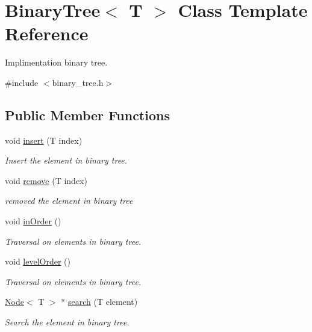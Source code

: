 \hypertarget{classBinaryTree}{}\section{Binary\+Tree$<$ T $>$ Class Template Reference}
\label{classBinaryTree}


Implimentation binary tree.  




{\ttfamily \#include $<$binary\+\_\+tree.\+h$>$}

\subsection*{Public Member Functions}
\begin{DoxyCompactItemize}
\item 
void \hyperlink{classBinaryTree_aad96066a6cd38d891d236c4917439209}{insert} (T index)
\begin{DoxyCompactList}\small\item\em Insert the element in binary tree. \end{DoxyCompactList}\item 
void \hyperlink{classBinaryTree_a515c06a7a49a8ee56d8fc3a4b6452938}{remove} (T index)
\begin{DoxyCompactList}\small\item\em removed the element in binary tree \end{DoxyCompactList}\item 
\mbox{\label{classBinaryTree_aea7786a4eb7ffd210d91cfbd97fe0334}} 
void \hyperlink{classBinaryTree_aea7786a4eb7ffd210d91cfbd97fe0334}{in\+Order} ()
\begin{DoxyCompactList}\small\item\em Traversal on elements in binary tree. \end{DoxyCompactList}\item 
\mbox{\label{classBinaryTree_ae60fbd0d6a213f25d5eaeeea747d0570}} 
void \hyperlink{classBinaryTree_ae60fbd0d6a213f25d5eaeeea747d0570}{level\+Order} ()
\begin{DoxyCompactList}\small\item\em Traversal on elements in binary tree. \end{DoxyCompactList}\item 
\hyperlink{structNode}{Node}$<$ T $>$ $\ast$ \hyperlink{classBinaryTree_ac483087e1890a5d750522412d8d5ae52}{search} (T element)
\begin{DoxyCompactList}\small\item\em Search the element in binary tree. \end{DoxyCompactList}\end{DoxyCompactItemize}



